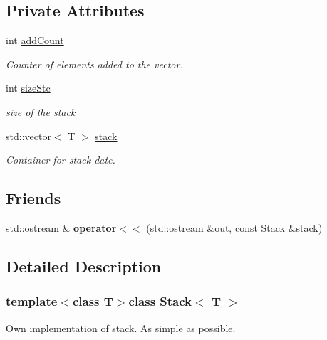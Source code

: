 \subsection*{Private Attributes}
\begin{DoxyCompactItemize}
\item 
int \hyperlink{class_stack_a1d8a45347230c7da1b7ad93b846f3b7e}{add\+Count}
\begin{DoxyCompactList}\small\item\em Counter of elements added to the vector. \end{DoxyCompactList}\item 
int \hyperlink{class_stack_a9e4b1d3525fd1febea119fb92610d207}{size\+Stc}
\begin{DoxyCompactList}\small\item\em size of the stack \end{DoxyCompactList}\item 
std\+::vector$<$ T $>$ \hyperlink{class_stack_ae2364efb487e7798c28a9c33a8e64f7a}{stack}
\begin{DoxyCompactList}\small\item\em Container for stack date. \end{DoxyCompactList}\end{DoxyCompactItemize}
\subsection*{Friends}
\begin{DoxyCompactItemize}
\item 
\hypertarget{class_stack_abe90d193ce343c152f2e9c46f17dc7de}{}std\+::ostream \& {\bfseries operator$<$$<$} (std\+::ostream \&out, const \hyperlink{class_stack}{Stack} \&\hyperlink{class_stack_ae2364efb487e7798c28a9c33a8e64f7a}{stack})\label{class_stack_abe90d193ce343c152f2e9c46f17dc7de}

\end{DoxyCompactItemize}


\subsection{Detailed Description}
\subsubsection*{template$<$class T$>$class Stack$<$ T $>$}

Own implementation of stack. As simple as possible. 

